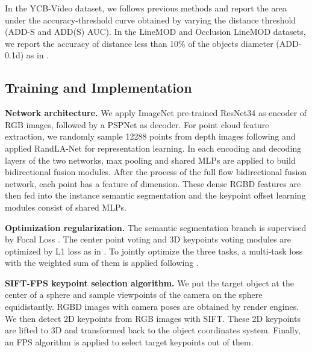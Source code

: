 In the YCB-Video dataset, we follows previous methods \cite{xiang2017posecnn,wang2019densefusion,he2020pvn3d} and report the area under the accuracy-threshold curve obtained by varying the distance threshold (ADD-S and ADD(S) AUC). In the LineMOD and Occlusion LineMOD datasets, we report the accuracy of distance less than 10\% of the objects diameter (ADD-0.1d) as in \cite{hinterstoisser2012model,peng2019pvnet}.

\subsection{Training and Implementation}
\textbf{Network architecture.} We apply ImageNet \cite{deng2009imagenet} pre-trained ResNet34 \cite{resnet} as encoder of RGB images, followed by a PSPNet \cite{zhao2017pyramid} as decoder.  For point cloud feature extraction, we randomly sample 12288 points from depth images following \cite{he2020pvn3d} and applied RandLA-Net \cite{hu2020randla} for representation learning. In each encoding and decoding layers of the two networks, max pooling and shared MLPs are applied to build bidirectional fusion modules. After the process of the full flow bidirectional fusion network, each point has a feature  of  dimension. These dense RGBD features are then fed into the instance semantic segmentation and the keypoint offset learning modules consist of shared MLPs.

\textbf{Optimization regularization.} The semantic segmentation branch is supervised by Focal Loss \cite{lin2017focal}. The center point voting and 3D keypoints voting modules are optimized by L1 loss as in \cite{he2020pvn3d}. To jointly optimize the three tasks, a multi-task loss with the weighted sum of them is applied following \cite{he2020pvn3d}.

\textbf{SIFT-FPS keypoint selection algorithm.} We put the target object at the center of a sphere and sample viewpoints of the camera on the sphere equidistantly. RGBD images with camera poses are obtained by render engines. We then detect 2D keypoints from RGB images with SIFT. These 2D keypoints are lifted to 3D and transformed back to the object coordinates system. Finally, an FPS algorithm is applied to select  target keypoints out of them.

